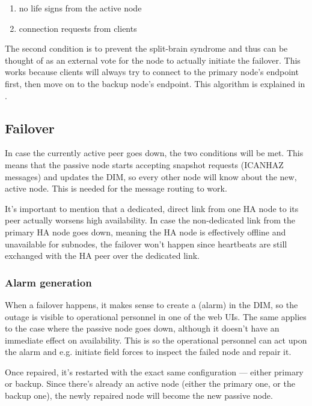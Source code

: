 \begin{enumerate}
\item no life signs from the active node
\item connection requests from clients
\end{enumerate}

The second condition is to prevent the split-brain syndrome and thus can be
thought of as an external vote for the node to actually initiate the failover.
This works because clients will always try to connect to the primary node's
endpoint first, then move on to the backup node's endpoint. This algorithm is
explained in \cite[Chapter 4 - Reliable Request-Reply Patterns, Client-Side
Reliability (Lazy Pirate Pattern)]{zmq:zguide}.

\subsection{Failover}
In case the currently active peer goes down, the two conditions will be met.
This means that the passive node starts accepting snapshot requests (ICANHAZ
messages) and updates the DIM, so every other node will know about the new,
active node. This is needed for the message routing to work.

It's important to mention that a dedicated, direct link from one HA node to its
peer actually worsens high availability. In case the non-dedicated link from
the primary HA node goes down, meaning the HA node is effectively offline and
unavailable for subnodes, the failover won't happen since heartbeats are still
exchanged with the HA peer over the dedicated link.


\subsubsection{Alarm generation}
When a failover happens, it makes sense to create a  (alarm) in the
DIM, so the outage is visible to operational personnel in one of the web UIs.
The same applies to the case where the passive node goes down, although it
doesn't have an immediate effect on availability.  This is so the operational
personnel can act upon the alarm and e.g. initiate field forces to inspect the
failed node and repair it.

Once repaired, it's restarted with the exact same configuration --- either primary
or backup. Since there's already an active node (either the primary one,
or the backup one), the newly repaired node will become the new passive node.


